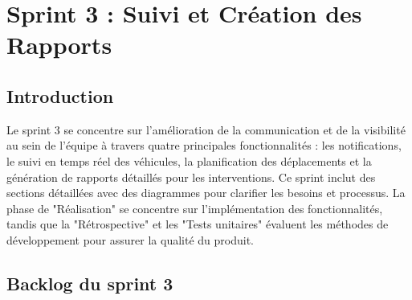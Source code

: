 
\chapter{Sprint 3 : Suivi et Création des Rapports}

\section*{Introduction}

Le sprint 3 se concentre sur l'amélioration de la communication et de la visibilité au sein de l'équipe à travers quatre principales fonctionnalités : les notifications, le suivi en temps réel des véhicules, la planification des déplacements et la génération de rapports détaillés pour les interventions. Ce sprint inclut des sections détaillées avec des diagrammes pour clarifier les besoins et processus. La phase de "Réalisation" se concentre sur l'implémentation des fonctionnalités, tandis que la "Rétrospective" et les "Tests unitaires" évaluent les méthodes de développement pour assurer la qualité du produit.


\section{Backlog du sprint 3}

